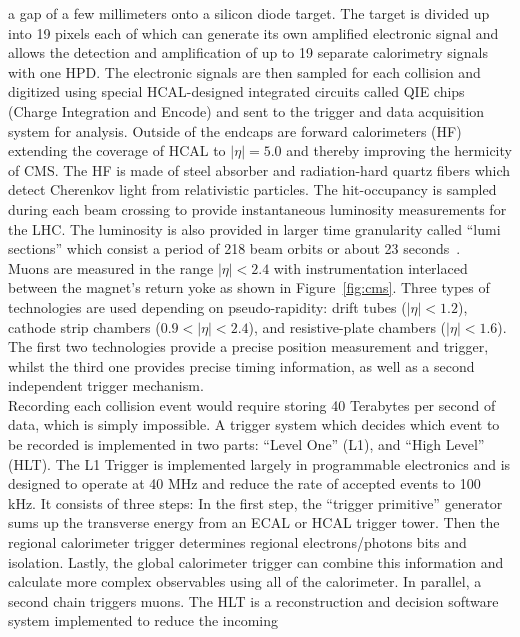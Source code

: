 a gap of a few millimeters onto a silicon diode target. The target is divided up into 19 pixels each 
of which can generate its own amplified electronic signal and allows the detection and amplification 
of up to 19 separate calorimetry signals with one HPD. The electronic signals are then sampled for 
each collision and digitized using special HCAL-designed integrated circuits called QIE chips (Charge 
Integration and Encode) and sent to the trigger and data acquisition system for analysis.
Outside of the endcaps are forward calorimeters (HF) extending the coverage of HCAL to $|\eta| = 5.0$ 
and thereby improving the hermicity of CMS. The HF is made of steel absorber and radiation-hard
quartz fibers which detect Cherenkov light from relativistic particles. The hit-occupancy is sampled
during each beam crossing to provide instantaneous luminosity measurements for the LHC. The luminosity
is also provided in larger time granularity called ``lumi sections'' which consist a period of
218 beam orbits or about 23 seconds~\cite{CMS-PAS-SMP-12-008}.\\ 
\indent Muons are measured in the range  $|\eta| < 2.4$ with instrumentation interlaced between the magnet's
return yoke as shown in Figure~\ref{fig:cms}. Three types of technologies are used depending
on pseudo-rapidity: drift tubes ($|\eta| < 1.2$), cathode strip chambers ($0.9 < |\eta| < 2.4$), and
resistive-plate chambers ($|\eta| < 1.6$). The ﬁrst two technologies provide a precise position measurement 
and trigger, whilst the third one provides precise timing information, as well as a second independent 
trigger mechanism. \\
\indent Recording each collision event would require storing 40 Terabytes per second of data, which
is simply impossible. A trigger system which decides which event to be recorded is implemented in 
two parts: ``Level One'' (L1), and ``High Level'' (HLT). The L1 Trigger is implemented largely in 
programmable electronics and is designed to operate at 40 MHz and reduce the rate of 
accepted events to 100 kHz. It consists of three steps: In the first step, the
``trigger primitive'' generator sums up the transverse energy from an ECAL or HCAL trigger
tower. Then the regional calorimeter trigger determines regional electrons/photons bits and isolation. 
Lastly, the global calorimeter trigger can combine this information and
calculate more complex observables using all of the calorimeter. In parallel, a second chain
triggers muons. 
The HLT is a reconstruction and decision software system implemented to reduce the incoming 
